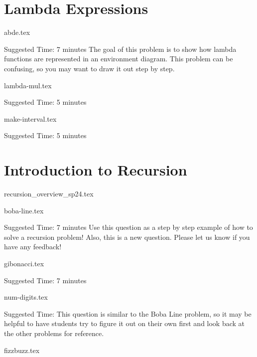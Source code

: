 \documentclass{exam}
\begin{document}
\section{Lambda Expressions}
\begin{questions}
    {abde.tex}
    \begin{questionmeta}
        Suggested Time: 7 minutes
        The goal of this problem is to show how lambda functions are represented in an environment diagram.
        This problem can be confusing, so you may want to draw it out step by step.
    \end{questionmeta}

    {lambda-mul.tex}
    \begin{questionmeta}
        Suggested Time: 5 minutes
    \end{questionmeta}

    {make-interval.tex}
    \begin{questionmeta}
        Suggested Time: 5 minutes
    \end{questionmeta}
\end{questions}

\section{Introduction to Recursion}
\begin{questions}
    {recursion_overview_sp24.tex}

    {boba-line.tex}
    \begin{questionmeta}
        Suggested Time: 7 minutes
        Use this question as a step by step example of how to solve a recursion problem!
        Also, this is a new question. Please let us know if you have any feedback!
    \end{questionmeta}

    {gibonacci.tex}
    \begin{questionmeta}
        Suggested Time: 7 minutes

    \end{questionmeta}

    {num-digits.tex}
    \begin{questionmeta}
        Suggested Time: 
        This question is similar to the Boba Line problem, so it may be helpful to have students try to figure it out on their own first and look back at the other problems for reference.
    \end{questionmeta}

    {fizzbuzz.tex}

\end{questions}
\end{document}
